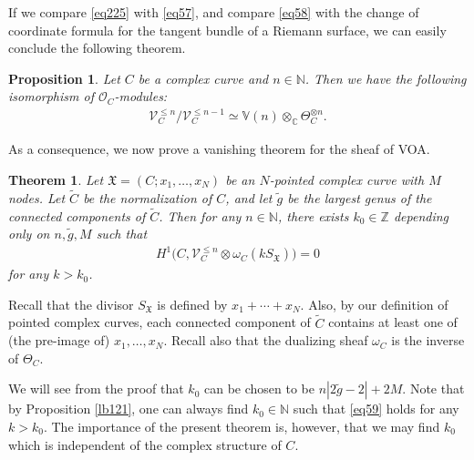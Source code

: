 \documentclass[12pt,a4paper,notitlepage]{report}
\theoremstyle{definition}
\theoremstyle{plain}
\newtheorem{thm}[df]{Theorem}
\newtheorem{pp}[df]{Proposition}
\newcommand{\fk}{\mathfrak}
\newcommand{\wtd}{\widetilde}
\newcommand{\scr}{\mathscr}
\newcommand{\SX}{S_{\fk X}}
\newcommand{\Vbb}{\mathbb V}
\newcommand{\Cbb}{\mathbb C}
\newcommand{\Nbb}{\mathbb N}
\newcommand{\Zbb}{\mathbb Z}
\numberwithin{equation}{section}
\begin{document}
If we compare \eqref{eq225} with \eqref{eq57}, and compare \eqref{eq58} with the change of coordinate formula for the tangent bundle of a Riemann surface, we can easily conclude the following theorem.

\begin{pp}\label{lb22}
Let $C$ be a complex curve and $n\in\Nbb$. Then we have the following isomorphism of  $\scr O_C$-modules:
\begin{align}
\scr V_C^{\leq n}/\scr V_C^{\leq n-1}\simeq\Vbb(n)\otimes_{\Cbb}\Theta_C^{\otimes n}.
\end{align}
\end{pp}

As a consequence, we now prove a vanishing theorem for the sheaf of VOA.

\begin{thm}\label{lb21}
Let $\fk X=(C;x_1,\dots,x_N)$ be an $N$-pointed complex curve with $M$ nodes.  Let  $\wtd C$ be the normalization of $C$, and let $\wtd g$ be the largest genus of the connected components of $\wtd C$.  Then for any $n\in\Nbb$, there exists $k_0\in\Zbb$ depending only on $n,\wtd g,M$ such that 
\begin{align}
H^1\big(C,\scr V_C^{\leq n}\otimes\omega_C(k\SX)\big)=0\label{eq59}
\end{align}
for any $k>k_0$.
\end{thm}


Recall that the divisor $\SX$ is defined by $x_1+\cdots+x_N$. Also, by our definition of pointed complex curves, each connected component of $\wtd C$ contains at least one of (the pre-image of) $x_1,\dots,x_N$. Recall also that the dualizing sheaf $\omega_C$ is the inverse of $\Theta_C$.

We will see from the proof that $k_0$ can be chosen to be $n|2\wtd g-2|+2M$. Note that by Proposition \ref{lb121}, one can always find $k_0\in\Nbb$ such that \eqref{eq59} holds for any $k>k_0$. The importance of the present theorem is, however, that we may find $k_0$ which is independent of the complex structure of $C$.
\end{document}
